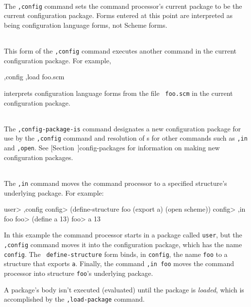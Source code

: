 \begin{description}
\item {} \\
    The {\tt,config} command sets the command processor's current
    package to be the current configuration package.  Forms entered at
    this point are interpreted as being configuration language forms,
    not Scheme forms.

\item {} \\
    This form of the {\tt,config} command executes another command in
    the current configuration package.  For example,
\begin{example}
,config ,load foo.scm
\end{example}
    interprets configuration language forms from the file {\tt
    foo.scm} in the current configuration package.

\item {} \\
    The {\tt,config-package-is} command designates a new configuration
    package for use by the {\tt,config} command and resolution of
    s for other commands such as {\tt,in} and
    {\tt,open}.  See
    [Section~\Ref]{config-packages}
    for information on making new configuration packages.

\item {} \\
    The {\tt ,in} command moves the command processor to a specified
    structure's underlying package.  For example:
\begin{example}
user> ,config
config> (define-structure foo (export a)
          (open scheme))
config> ,in foo
foo> (define a 13)
foo> a
13
\end{example}
    In this example the command processor starts in a package called
    {\tt user}, but the {\tt ,config} command moves it into the
    configuration package, which has the name {\tt config}.  The {\tt
    define-structure} form binds, in {\tt config}, the name {\tt foo} to
    a structure that exports {\tt a}.  Finally, the command {\tt ,in
    foo} moves the command processor into structure {\tt foo}'s
    underlying package.

    A package's body isn't executed (evaluated) until the package is
    {\em loaded}, which is accomplished by the {\tt ,load-package}
    command.


\end{description}
